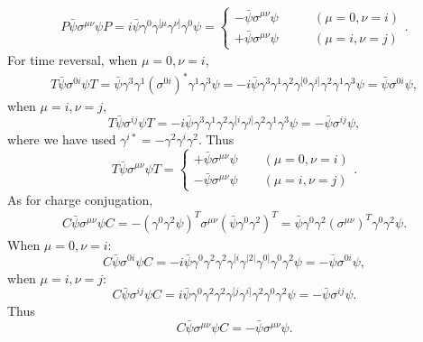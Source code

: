 \solution
\begin{problembody}
    \item 
    \begin{align*}
        P\bar{\psi}\sigma^{\mu\nu}\psi P
        = i\bar{\psi}\gamma^0\gamma^{[\mu}\gamma^{\nu]}\gamma^0\psi
        = \begin{cases}
            -\bar{\psi}\sigma^{\mu\nu}\psi \qquad & (\mu = 0, \nu = i)\\
            +\bar{\psi}\sigma^{\mu\nu}\psi \qquad & (\mu = i, \nu = j)
        \end{cases}.
    \end{align*}
    For time reversal, when $\mu = 0, \nu = i$,
    \begin{align*}
        T\bar{\psi}\sigma^{0i}\psi T
        = \bar{\psi}\gamma^3\gamma^1(\sigma^{0i})^\ast\gamma^1\gamma^3\psi
        = -i\bar{\psi}\gamma^3\gamma^1\gamma^2\gamma^{[0}\gamma^{i]}\gamma^2\gamma^1\gamma^3\psi
        = \bar{\psi}\sigma^{0i}\psi,
    \end{align*}
    when $\mu = i, \nu = j$,
    \begin{equation*}
        T\bar{\psi}\sigma^{ij}\psi T
        = -i\bar{\psi}\gamma^3\gamma^1\gamma^2\gamma^{[i}\gamma^{j]}\gamma^2\gamma^1\gamma^3\psi
        = -\bar{\psi}\sigma^{ij}\psi,
    \end{equation*}
    where we have used $\gamma^{i\ast} = -\gamma^2\gamma^i\gamma^2$. Thus
    \begin{equation*}
        T\bar{\psi}\sigma^{\mu\nu}\psi T = \begin{cases}
            +\bar{\psi}\sigma^{\mu\nu}\psi \qquad (\mu = 0, \nu = i)\\
            -\bar{\psi}\sigma^{\mu\nu}\psi \qquad (\mu = i, \nu = j)
        \end{cases}.
    \end{equation*}
    As for charge conjugation,
    \begin{align*}
        C\bar{\psi}\sigma^{\mu\nu}\psi C
        = -(\gamma^0\gamma^2\psi)^T\sigma^{\mu\nu}(\bar{\psi}\gamma^0\gamma^2)^T
        = \bar{\psi}\gamma^0\gamma^2(\sigma^{\mu\nu})^T\gamma^0\gamma^2\psi.
    \end{align*}
    When $\mu = 0, \nu = i$:
    \begin{equation*}
        C\bar{\psi}\sigma^{0i}\psi C
        = -i\bar{\psi}\gamma^0\gamma^2\gamma^2\gamma^{[i}\gamma^{|2|}\gamma^{0]}\gamma^0\gamma^2\psi
        = -\bar{\psi}\sigma^{0i}\psi,
    \end{equation*}
    when $\mu = i, \nu = j$:
    \begin{equation*}
        C\bar{\psi}\sigma^{ij}\psi C
        = i\bar{\psi}\gamma^0\gamma^2\gamma^2\gamma^{[j}\gamma^{i]}\gamma^2\gamma^0\gamma^2\psi
        = -\bar{\psi}\sigma^{ij}\psi.
    \end{equation*}
    Thus 
    \[
        C\bar{\psi}\sigma^{\mu\nu}\psi C
        = -\bar{\psi}\sigma^{\mu\nu}\psi.
    \]


\end{problembody}
